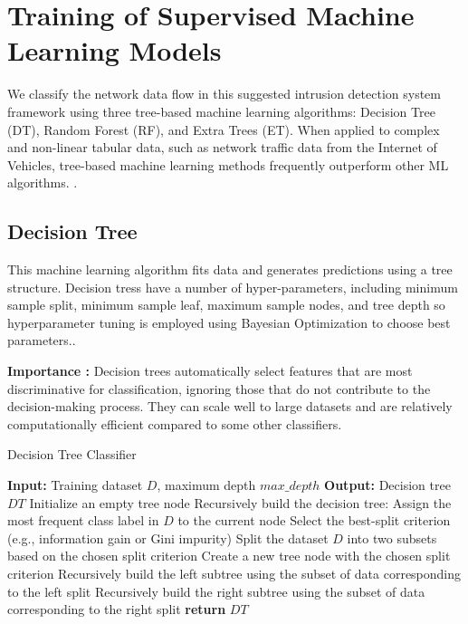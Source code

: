 \section{Training of Supervised Machine Learning Models}
We classify the network data flow in this suggested intrusion detection system framework using three tree-based machine learning algorithms: Decision Tree (DT), Random Forest (RF), and Extra Trees (ET). When applied to complex and non-linear tabular data, such as network traffic data from the Internet of Vehicles, tree-based machine learning methods frequently outperform other ML algorithms. \cite{uddin2024confirming}.

\subsection{Decision Tree}
{
This machine learning algorithm fits data and generates predictions using a tree structure. Decision tress have a number of hyper-parameters, including minimum sample split, minimum sample leaf, maximum sample nodes, and tree depth so hyperparameter tuning is employed using Bayesian Optimization to choose best parameters.\cite{akiba2019optuna}.

 \par \textbf{Importance :}{
 Decision trees automatically select features that are most discriminative for classification, ignoring those that do not contribute to the decision-making process. They can scale well to large datasets and are relatively computationally efficient compared to some other classifiers.
 }

 \begin{algorithm}
\caption{Decision Tree Classifier}
\label{alg:decision_tree}
\begin{algorithmic}[1]
\Statex \textbf{Input:} Training dataset $D$, maximum depth $max\_depth$
\Statex \textbf{Output:} Decision tree $DT$
\State Initialize an empty tree node
\State Recursively build the decision tree:
        \State Assign the most frequent class label in $D$ to the current node
    \Else
        \State Select the best-split criterion (e.g., information gain or Gini impurity)
        \State Split the dataset $D$ into two subsets based on the chosen split criterion
        \State Create a new tree node with the chosen split criterion
        \State Recursively build the left subtree using the subset of data corresponding to the left split
        \State Recursively build the right subtree using the subset of data corresponding to the right split
    \EndIf
\State \textbf{return} $DT$
\end{algorithmic}
\end{algorithm}

}

